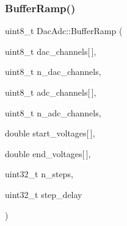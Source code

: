 \subsubsection{\texorpdfstring{Buffer\+Ramp()}{BufferRamp()}}
{\footnotesize\ttfamily uint8\+\_\+t Dac\+Adc\+::\+Buffer\+Ramp (\begin{DoxyParamCaption}\item[{uint8\+\_\+t}]{dac\+\_\+channels\mbox{[}$\,$\mbox{]},  }\item[{uint8\+\_\+t}]{n\+\_\+dac\+\_\+channels,  }\item[{uint8\+\_\+t}]{adc\+\_\+channels\mbox{[}$\,$\mbox{]},  }\item[{uint8\+\_\+t}]{n\+\_\+adc\+\_\+channels,  }\item[{double}]{start\+\_\+voltages\mbox{[}$\,$\mbox{]},  }\item[{double}]{end\+\_\+voltages\mbox{[}$\,$\mbox{]},  }\item[{uint32\+\_\+t}]{n\+\_\+steps,  }\item[{uint32\+\_\+t}]{step\+\_\+delay }\end{DoxyParamCaption})}

